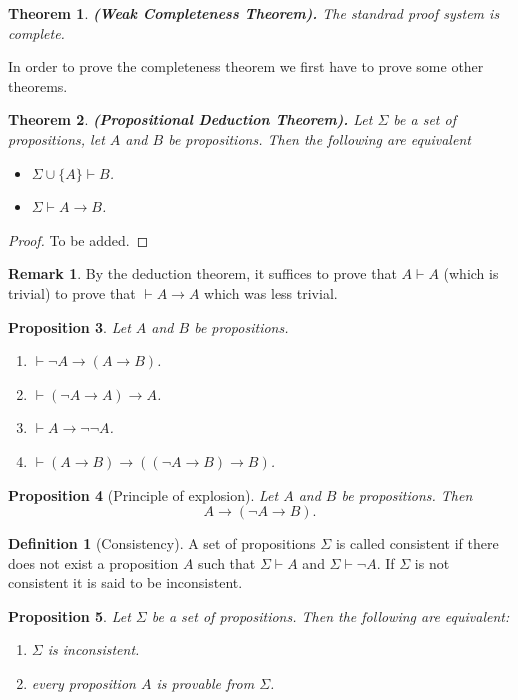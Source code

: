 \documentclass[11pt,a4paper]{article}
\theoremstyle{definition}
\newtheorem{definition}{Definition}[section]
\newtheorem{remark}{Remark}[section]
\theoremstyle{plain}
\newtheorem{theorem}{Theorem}[section]
\newtheorem{proposition}[theorem]{Proposition}
\renewcommand{\tt}[1]{\textnormal{\textbf{(#1).}}} %
\renewcommand{\implies}{\rightarrow}
\begin{document}
  \begin{theorem}\label{thm:weak-completeness}\tt{Weak Completeness Theorem}
    The standrad proof system is complete.
  \end{theorem}
  
  In order to prove the completeness theorem we first have to prove
  some other theorems.

  \begin{theorem}\tt{Propositional Deduction Theorem}
    Let $\Sigma$ be a set of propositions, let $A$ and $B$ be propositions.
    Then the following are equivalent
    \begin{itemize}
      \item[(1)] $\Sigma \cup \{A\} \vdash B$.
      \item[(2)] $\Sigma \vdash A \implies B$.
    \end{itemize}
  \end{theorem}
  \begin{proof}
    To be added.
  \end{proof}
  
  \begin{remark}
    By the deduction theorem, it suffices to prove that $A \vdash A$
    (which is trivial) to prove that $\vdash A \to A$ which was less
    trivial.
  \end{remark}

  \begin{proposition}
    Let $A$ and $B$ be propositions.
    \begin{enumerate}
      \item[(1)] $\vdash \neg A \implies (A \implies B)$.
      \item[(2)] $\vdash (\neg A \implies A) \implies A$.
      \item[(3)] $\vdash A \implies \neg \neg A$.
      \item[(4)] $\vdash (A \implies B) \implies 
        ((\neg A \implies B) \implies B)$.
    \end{enumerate}
  \end{proposition}

  \begin{proposition}[Principle of explosion]
    Let $A$ and $B$ be propositions. Then
    \[ A \implies (\neg A \implies B). \]
  \end{proposition}

  \begin{definition}[Consistency]
    A set of propositions $\Sigma$ is called consistent if there does
    not exist a proposition $A$ such that $\Sigma \vdash A$ and 
    $\Sigma \vdash \neg A$. If $\Sigma$ is not consistent it is said
    to be inconsistent.
  \end{definition}
  \begin{proposition}
    Let $\Sigma$ be a set of propositions. Then the following are equivalent:
    \begin{enumerate}
      \item[(1)] $\Sigma$ is inconsistent.
      \item[(2)] every proposition $A$ is provable from $\Sigma$.
    \end{enumerate}
  \end{proposition}
\end{document}
